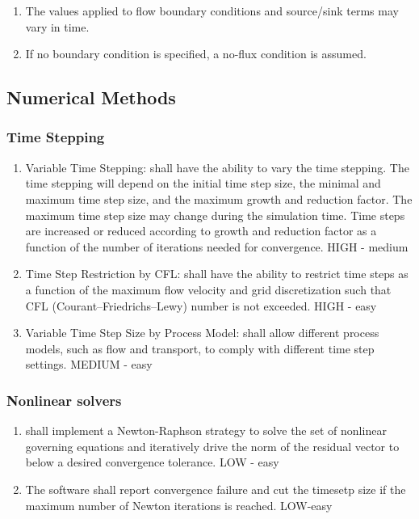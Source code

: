 \begin{enumerate}[resume]
	\item The values applied to flow boundary conditions and source/sink terms may vary in time. 
\label{FRvaryTime}
	\item If no boundary condition is specified, a no-flux condition is assumed. \label{FRnoFlow}
\end{enumerate}

\subsection{Numerical Methods}

\subsubsection{Time Stepping}
\begin{enumerate}
	\item Variable Time Stepping: \label{NMvarTS} \pft shall have the ability to vary the time stepping. The time stepping will depend on the initial time step size, the minimal and maximum time step size, and the maximum growth and reduction factor. The maximum time step size may change during the simulation time. Time steps are increased or reduced according to growth and reduction factor as a function of the number of iterations needed for convergence. HIGH - medium
	\item Time Step Restriction by CFL: \label{TSbyCFL} \pft shall have the ability to restrict time steps as a function of the maximum flow velocity and grid discretization such that CFL (Courant–Friedrichs–Lewy) number is not exceeded. HIGH - easy
	\item Variable Time Step Size by Process Model: \label{TSbyModel} \pft shall allow different process models, such as flow and transport, to comply with different time step settings. MEDIUM - easy
\end{enumerate}

\subsubsection{Nonlinear solvers}
\begin{enumerate}[resume]
	\item \pft shall implement a Newton-Raphson strategy to solve the set of nonlinear governing equations and iteratively drive the norm of the residual vector to below a desired convergence tolerance. \label{nonlinearSolver} LOW - easy
	\item The software shall report convergence failure and cut the timesetp size if the maximum number of Newton iterations is reached. \label{nonlinearReport} LOW-easy
\end{enumerate}

